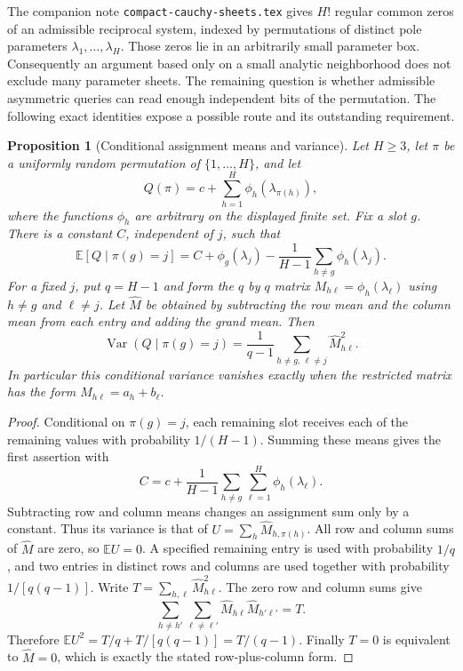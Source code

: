 \documentclass[11pt]{article}
\newtheorem{proposition}{Proposition}
\begin{document}
The companion note \texttt{compact-cauchy-sheets.tex} gives $H!$
regular common zeros of an admissible reciprocal system, indexed by
permutations of distinct pole parameters
$\lambda_1,\ldots,\lambda_H$. Those zeros lie in an arbitrarily
small parameter box. Consequently an argument based only on a small
analytic neighborhood does not exclude many parameter sheets. The
remaining question is whether admissible asymmetric queries can read
enough independent bits of the permutation. The following exact
identities expose a possible route and its outstanding requirement.

\begin{proposition}[Conditional assignment means and variance]
\label{prop:permutation-average}
Let $H\ge3$, let $\pi$ be a uniformly random permutation of
$\{1,\ldots,H\}$, and let
\[
 Q(\pi)=c+\sum_{h=1}^H\phi_h(\lambda_{\pi(h)}),
\]
where the functions $\phi_h$ are arbitrary on the displayed finite
set. Fix a slot $g$. There is a constant $C$, independent of $j$,
such that
\[
 \mathbb E[Q\mid\pi(g)=j]
 =C+\phi_g(\lambda_j)
       -\frac1{H-1}\sum_{h\ne g}\phi_h(\lambda_j).
\]
For a fixed $j$, put $q=H-1$ and form the $q$ by $q$ matrix
$M_{h\ell}=\phi_h(\lambda_\ell)$ using $h\ne g$ and
$\ell\ne j$. Let $\widehat M$ be obtained by subtracting the row
mean and the column mean from each entry and adding the grand mean.
Then
\[
 \operatorname{Var}(Q\mid\pi(g)=j)
 =\frac1{q-1}\sum_{h\ne g,\,\ell\ne j}
       \widehat M_{h\ell}^{2}.
\]
In particular this conditional variance vanishes exactly when the
restricted matrix has the form $M_{h\ell}=a_h+b_\ell$.
\end{proposition}
\begin{proof}
Conditional on $\pi(g)=j$, each remaining slot receives each of the
remaining values with probability $1/(H-1)$. Summing these means
gives the first assertion with
\[
 C=c+\frac1{H-1}\sum_{h\ne g}\sum_{\ell=1}^H
             \phi_h(\lambda_\ell).
\]
Subtracting row and column means changes an assignment sum only by
a constant. Thus its variance is that of
$U=\sum_h\widehat M_{h,\pi(h)}$. All row and column sums of
$\widehat M$ are zero, so $\mathbb E U=0$. A specified remaining
entry is used with probability $1/q$, and two entries in distinct
rows and columns are used together with probability $1/[q(q-1)]$.
Write $T=\sum_{h,\ell}\widehat M_{h\ell}^2$. The zero row and
column sums give
\[
 \sum_{h\ne h'}\sum_{\ell\ne\ell'}
       \widehat M_{h\ell}\widehat M_{h'\ell'}=T.
\]
Therefore
$\mathbb E U^2=T/q+T/[q(q-1)]=T/(q-1)$.
Finally $T=0$ is equivalent to $\widehat M=0$, which is exactly
the stated row-plus-column form.
\end{proof}
\end{document}
